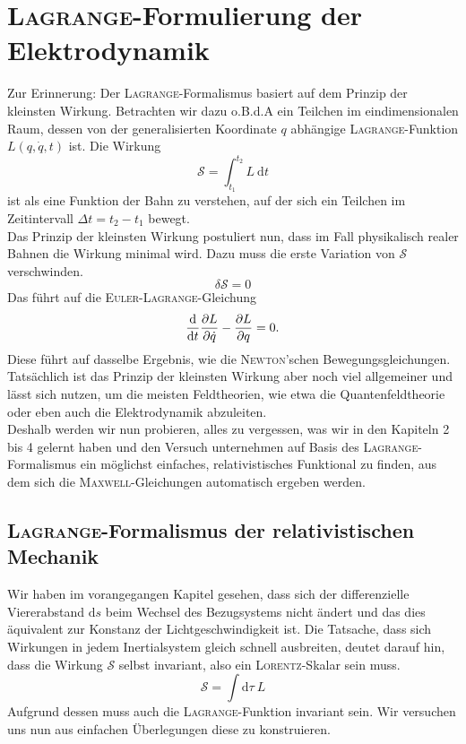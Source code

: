 \chapter[\textsc{Lagrange}-Formulierung]{\textsc{Lagrange}-Formulierung der Elektrodynamik}

Zur Erinnerung: Der \textsc{Lagrange}-Formalismus basiert auf dem Prinzip der kleinsten Wirkung. Betrachten wir dazu o.B.d.A ein Teilchen im eindimensionalen Raum, dessen von der generalisierten Koordinate $q$ abhängige \textsc{Lagrange}-Funktion $L(q,\dot{q},t)$ ist. Die Wirkung
\begin{equation*}
\mathcal{S} = \int_{t_1}^{t_2}L\ \mathrm{d}t
\end{equation*}
ist als eine Funktion der Bahn zu verstehen, auf der sich ein Teilchen im Zeitintervall $\Delta t = t_2-t_1$ bewegt. \\
Das Prinzip der kleinsten Wirkung postuliert nun, dass im Fall physikalisch realer Bahnen die Wirkung minimal wird. Dazu muss die erste Variation von $\mathcal{S}$ verschwinden.
\begin{equation*}
\delta\mathcal{S} = 0
\end{equation*}
Das führt auf die \textsc{Euler-Lagrange}-Gleichung
\begin{equation*}
\frac{\mathrm{d}{}}{\mathrm{d}{t}}\frac{\partial L}{\partial \dot{q}} - \frac{\partial L}{\partial q} = 0.
\end{equation*}
Diese führt auf dasselbe Ergebnis, wie die \textsc{Newton}'schen Bewegungsgleichungen. Tatsächlich ist das Prinzip der kleinsten Wirkung aber noch viel allgemeiner und lässt sich nutzen, um die meisten Feldtheorien, wie etwa die Quantenfeldtheorie oder eben auch die Elektrodynamik abzuleiten. \\
Deshalb werden wir nun probieren, alles zu vergessen, was wir in den  Kapiteln 2 bis 4 gelernt haben und den Versuch unternehmen auf Basis des \textsc{Lagrange}-Formalismus ein möglichst einfaches, relativistisches Funktional zu finden, aus dem sich die \textsc{Maxwell}-Gleichungen automatisch ergeben werden.

\section[\textsc{Lagrange}: relativistische Mechanik]{\textsc{Lagrange}-Formalismus der relativistischen Mechanik}

Wir haben im vorangegangen Kapitel gesehen, dass sich der differenzielle Viererabstand $\mathrm{d}s$ beim Wechsel des Bezugsystems nicht ändert und das dies äquivalent zur Konstanz der Lichtgeschwindigkeit ist. Die Tatsache, dass sich Wirkungen in jedem Inertialsystem gleich schnell ausbreiten, deutet darauf hin, dass die Wirkung $\mathcal{S}$ selbst invariant, also ein \textsc{Lorentz}-Skalar sein muss.
\begin{equation*}
\mathcal{S}=\int\mathrm{d}\tau\ L
\end{equation*}
Aufgrund dessen muss auch die \textsc{Lagrange}-Funktion invariant sein. Wir versuchen uns nun aus einfachen Überlegungen diese zu konstruieren.

